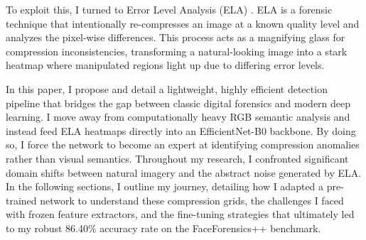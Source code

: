To exploit this, I turned to Error Level Analysis (ELA) \cite{ela2012}. ELA is a forensic technique that intentionally re-compresses an image at a known quality level and analyzes the pixel-wise differences. This process acts as a magnifying glass for compression inconsistencies, transforming a natural-looking image into a stark heatmap where manipulated regions light up due to differing error levels.

In this paper, I propose and detail a lightweight, highly efficient detection pipeline that bridges the gap between classic digital forensics and modern deep learning. I move away from computationally heavy RGB semantic analysis and instead feed ELA heatmaps directly into an EfficientNet-B0 \cite{efficientnet} backbone. By doing so, I force the network to become an expert at identifying compression anomalies rather than visual semantics. Throughout my research, I confronted significant domain shifts between natural imagery and the abstract noise generated by ELA. In the following sections, I outline my journey, detailing how I adapted a pre-trained network to understand these compression grids, the challenges I faced with frozen feature extractors, and the fine-tuning strategies that ultimately led to my robust 86.40\% accuracy rate on the FaceForensics++ benchmark.

